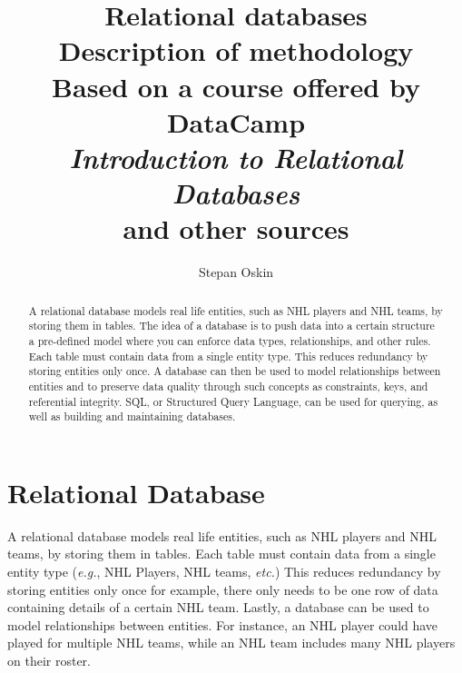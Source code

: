 \documentclass[11pt]{article}
\begin{document}
    \title{Relational databases \\
    Description of methodology \\
    Based on a course offered by DataCamp \\
    \textit{Introduction to Relational Databases}\cite{Grossenbacher2019} \\
    and other sources}

    \author{Stepan Oskin}

    \maketitle

    \begin{abstract}
        A relational database models real life entities, such as NHL players and NHL teams, by storing them in tables.
        The idea of a database is to push data into a certain structure \textemdash a pre-defined model \textemdash where you can enforce data types, relationships, and other rules.
        Each table must contain data from a single entity type.
        This reduces redundancy by storing entities only once.
        A database can then be used to model relationships between entities and to preserve data quality through such concepts as constraints, keys, and referential integrity.
        SQL, or Structured Query Language, can be used for querying, as well as building and maintaining databases.
    \end{abstract}

    \section{Relational Database} \label{sec:rdb}

    A relational database models real life entities, such as NHL players and NHL teams, by storing them in tables.
    Each table must contain data from a single entity type (\textit{e.g.}, NHL Players, NHL teams, \textit{etc.})
    This reduces redundancy by storing entities only once \textemdash for example, there only needs to be one row of data containing details of a certain NHL team.
    Lastly, a database can be used to model relationships between entities.
    For instance, an NHL player could have played for multiple NHL teams, while an NHL team includes many NHL players on their roster.
\end{document}
